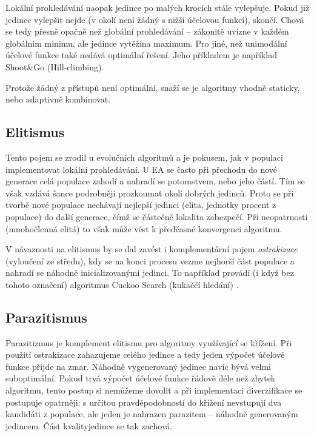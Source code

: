 Lokální prohledávání naopak jedince po malých krocích stále vylepšuje. Pokud již jedinec vylepšit nejde (v okolí není žádný s nižší účelovou funkcí), skončí. Chová se tedy přesně opačně než globální prohledávání -- zákonitě uvízne v každém globálním minimu, ale jedince \bq vytěží\eq na maximum. Pro jiné, než unimodální účelové funkce také nedává optimální řešení. Jeho příkladem je například Shoot\&Go (Hill-climbing).

Protože žádný z přístupů není optimální, snaží se je algoritmy vhodně staticky, nebo adaptivně kombinovat.

\subsection{Elitismus}

Tento pojem se zrodil u evolučních algoritmů a je pokusem, jak v populaci implementovat lokální prohledávání. U EA se často při přechodu do nové generace celá populace zahodí a nahradí se potomstvem, nebo jeho částí. Tím se však vzdává šance podrobněji prozkoumat okolí dobrých jedinců. Proto se při tvorbě nové populace nechávají nejlepší jedinci (elita, jednotky procent z populace) do další generace, čímž se částečně lokalita zabezpečí. Při neopatrnosti (mnohočlenná elitá) to však může vést k předčasné konvergenci algoritmu.

V návaznosti na elitismus by se dal zavést i komplementární pojem \emph{ostrakizace} (\bq vyloučení ze středu\eq), kdy se na konci procesu vezme nejhorší část populace a nahradí se náhodně inicializovanými jedinci. To například provádí (i když bez tohoto označení) algoritmus Cuckoo Search (kukaččí hledání) \cite{cuckoo}.

\subsection{Parazitismus}

Parazitizmus je komplement elitismu pro algoritmy využívající se křížení. Při použití ostrakizace zahazujeme celého jedince a tedy jeden výpočet účelové funkce přijde na zmar. Náhodně vygenerovaný jedinec navíc bývá velmi suboptimální. Pokud trvá výpočet účelové funkce řádově déle než zbytek algoritmu, tento postup si nemůžeme dovolit a při implementaci diverzifikace se postupuje opatrněji: s určitou pravděpodobností do křížení nevstupují dva kandidáti z populace, ale jeden je nahrazen parazitem -- náhodně generovaným jedincem. Část \bq kvality\eq jedince se tak zachová.

